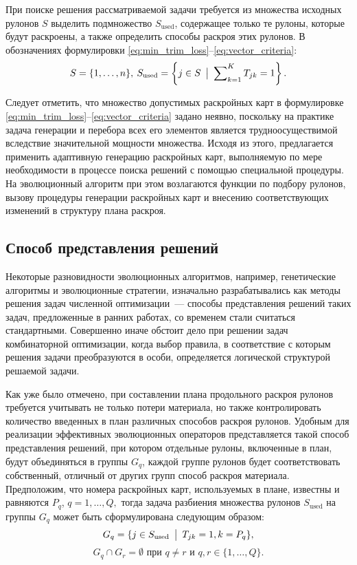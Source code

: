 \documentclass[12pt]{article}
\begin{document}
При поиске решения рассматриваемой задачи требуется из множества исходных 
рулонов $S$ выделить подмножество $S_{\text{used}}$, содержащее только те 
рулоны, которые будут раскроены, а также определить способы раскроя этих 
рулонов. В обозначениях формулировки 
\eqref{eq:min_trim_loss}--\eqref{eq:vector_criteria}:
\[ S=\{1,\ldots,n\},\: 
   S_{\text{used}}=\left\{ j \in S \: \bigm| \: \sum\nolimits_{k=1}^{K} T_{jk}=1 \right\}. \]

Следует отметить, что множество допустимых раскройных карт в формулировке 
\eqref{eq:min_trim_loss}--\eqref{eq:vector_criteria} 
задано неявно, поскольку на практике задача генерации и перебора всех 
его элементов является трудноосуществимой вследствие значительной мощности 
множества. Исходя из этого, предлагается применить адаптивную генерацию 
раскройных карт, выполняемую по мере необходимости в процессе поиска решений 
с помощью специальной процедуры. На эволюционный алгоритм при этом возлагаются 
функции по подбору рулонов, вызову процедуры генерации раскройных карт и 
внесению соответствующих изменений в структуру плана раскроя.

\subsection{Способ представления решений}

Некоторые разновидности эволюционных алгоритмов, например, генетические
алгоритмы и эволюционные стратегии, изначально разрабатывались как методы 
решения задач численной оптимизации~--- способы представления решений таких 
задач, предложенные в ранних работах, со временем стали считаться стандартными. 
Совершенно иначе обстоит дело при решении задач комбинаторной оптимизации, 
когда выбор правила, в соответствие с которым решения задачи преобразуются в 
особи, определяется логической структурой решаемой задачи.

Как уже было отмечено, при составлении плана продольного раскроя рулонов 
требуется учитывать не только потери материала, но также контролировать 
количество введенных в план различных способов раскроя рулонов. Удобным для 
реализации эффективных эволюционных операторов представляется такой способ 
представления решений, при котором отдельные рулоны, включенные в план, 
будут объединяться в группы $G_q$, каждой группе рулонов будет соответствовать 
собственный, отличный от других групп способ раскроя материала. Предположим, 
что номера раскройных карт, используемых в плане, известны и равняются $P_q$, 
$q=1,\ldots,Q,$ тогда задача разбиения множества рулонов $S_{\text{used}}$ 
на группы $G_q$ может быть сформулирована следующим образом:
\[ G_q=\{ j \in S_{\text{used}} \: \bigm| \: T_{jk}=1,k=P_q \}, \]
\[ G_q \cap G_r=\emptyset \text{ при } q \neq r \text{ и } q,r \in \{1,\ldots,Q\}. \]
\end{document}
